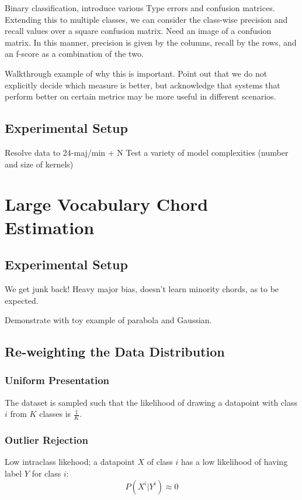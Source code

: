 Binary classification, introduce various Type errors and confusion matrices.
Extending this to multiple classes, we can consider the class-wise precision and recall values over a square confusion matrix.
Need an image of a confusion matrix.
In this manner, precision is given by the columns, recall by the rows, and an f-score as a combination of the two.

Walkthrough example of why this is important.
Point out that we do not explicitly decide which measure is better, but acknowledge that systems that perform better on certain metrics may be more useful in different scenarios.


\subsection{Experimental Setup}

Resolve data to 24-maj/min + N
Test a variety of model complexities (number and size of kernels)





\section{Large Vocabulary Chord Estimation}



\subsection{Experimental Setup}



We get junk back! Heavy major bias, doesn't learn minority chords, as to be expected.

Demonstrate with toy example of parabola and Gaussian.

\subsection{Re-weighting the Data Distribution}

\subsubsection{Uniform Presentation}
The dataset is sampled such that the likelihood of drawing a datapoint with class $i$ from $K$ classes is $\frac{1}{K}$.

\subsubsection{Outlier Rejection}
Low intraclass likehood; a datapoint $X$ of class $i$ has a low likelihood of having label $Y$ for class $i$:
\begin{equation}
P(X^i | Y^i) \approx 0
\label{eq:outliers}
\end{equation}


